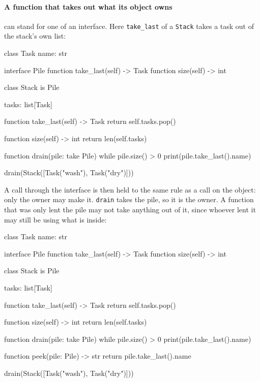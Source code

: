 \paragraph{A function that takes out what its object owns} can stand
for one of an interface. Here \verb|take_last| of a \verb|Stack| takes
a task out of the stack's own list:

\begin{zeno}[file=pile.zeno, dir=owners, cmd=zeno build --no-collector {file} ;; ./pile]
class Task {
    name: str
}

interface Pile {
    function take_last(self) -> Task
    function size(self) -> int
}

class Stack is Pile {
    tasks: list[Task]

    function take_last(self) -> Task {
        return self.tasks.pop()
    }

    function size(self) -> int {
        return len(self.tasks)
    }
}

function drain(pile: take Pile) {
    while pile.size() > 0 {
        print(pile.take_last().name)
    }
}

drain(Stack([Task("wash"), Task("dry")]))
\end{zeno}

A call through the interface is then held to the same rule as a call
on the object: only the owner may make it. \verb|drain| takes the
pile, so it is the owner. A function that was only lent the pile may
not take anything out of it, since whoever lent it may still be using
what is inside:

\begin{zeno}[file=pile.zeno, dir=owners, lines=28-30, cmd=zeno build --no-collector {file}, fails=yes]
class Task {
    name: str
}

interface Pile {
    function take_last(self) -> Task
    function size(self) -> int
}

class Stack is Pile {
    tasks: list[Task]

    function take_last(self) -> Task {
        return self.tasks.pop()
    }

    function size(self) -> int {
        return len(self.tasks)
    }
}

function drain(pile: take Pile) {
    while pile.size() > 0 {
        print(pile.take_last().name)
    }
}

function peek(pile: Pile) -> str {
    return pile.take_last().name
}

drain(Stack([Task("wash"), Task("dry")]))
\end{zeno}


